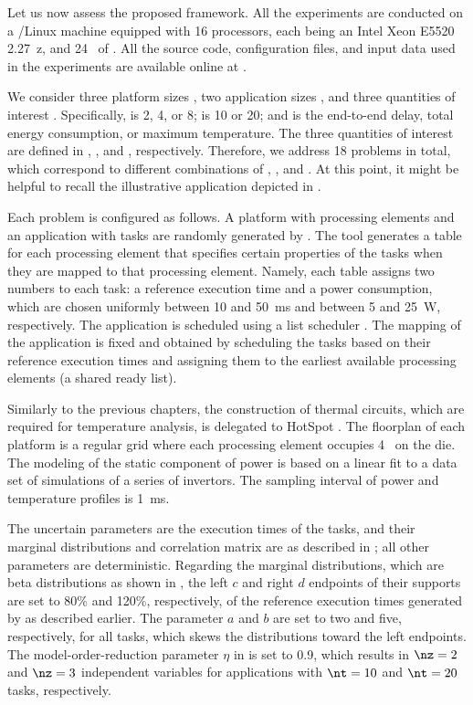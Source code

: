 Let us now assess the proposed framework. All the experiments are conducted on a
/Linux machine equipped with 16 processors, each being an Intel Xeon
E5520 2.27~z, and 24~ of . All the source code,
configuration files, and input data used in the experiments are available online
at \cite{eslab2017a}.

We consider three platform sizes \np, two application sizes \nt, and three
quantities of interest \g. Specifically, \np is 2, 4, or 8; \nt is 10 or 20; and
\g is the end-to-end delay, total energy consumption, or maximum temperature.
The three quantities of interest are defined in ,
, and , respectively. Therefore, we
address 18 problems in total, which correspond to different combinations of \np,
\nt, and \g. At this point, it might be helpful to recall the illustrative
application depicted in .

Each problem is configured as follows. A platform with \np processing elements
and an application with \nt tasks are randomly generated by 
\cite{dick1998}. The tool generates a table for each processing element that
specifies certain properties of the tasks when they are mapped to that
processing element. Namely, each table assigns two numbers to each task: a
reference execution time and a power consumption, which are chosen uniformly
between 10 and 50~ms and between 5 and 25~W, respectively. The application is
scheduled using a list scheduler \cite{adam1974}. The mapping of the application
is fixed and obtained by scheduling the tasks based on their reference execution
times and assigning them to the earliest available processing elements (a shared
ready list).

Similarly to the previous chapters, the construction of thermal 
circuits, which are required for temperature analysis, is delegated to HotSpot
\cite{skadron2003}. The floorplan of each platform is a regular grid where each
processing element occupies 4~ on the die. The modeling of the
static component of power is based on a linear fit to a data set of 
simulations of a series of  invertors. The sampling interval \dt of
power and temperature profiles is 1~ms.

The uncertain parameters \vu are the execution times of the tasks, and their
marginal distributions and correlation matrix are as described in
; all other parameters are deterministic.
Regarding the marginal distributions, which are beta distributions as shown in
, the left $c$ and right $d$ endpoints of their supports
are set to 80\% and 120\%, respectively, of the reference execution times
generated by  as described earlier. The parameter $a$ and $b$ are set
to two and five, respectively, for all tasks, which skews the distributions
toward the left endpoints. The model-order-reduction parameter $\eta$ in
 is set to 0.9, which results in $\nz = 2$ and $\nz
= 3$ independent variables for applications with $\nt = 10$ and $\nt = 20$
tasks, respectively.

